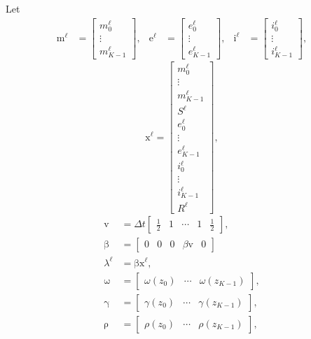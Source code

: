 \documentclass{jpmarticle}
\renewcommand{\vec}[1]{\boldsymbol{\mathrm{#1}}}
\begin{document}
Let
\begin{align}
  \vec{m}^{\ell} &=
  \begin{bmatrix}
    m_0^{\ell} \\ \vdots \\ m_{K - 1}^{\ell}
  \end{bmatrix},
  &
  \vec{e}^{\ell} &=
  \begin{bmatrix}
    e_0^{\ell} \\ \vdots \\ e_{K - 1}^{\ell}
  \end{bmatrix},
  &
  \vec{i}^{\ell} &=
  \begin{bmatrix}
    i_0^{\ell} \\ \vdots \\ i_{K - 1}^{\ell}
  \end{bmatrix},
\end{align}
\begin{equation}
  \vec{x}^{\ell} =
  \begin{bmatrix}
    m_0^{\ell} \\ \vdots \\ m_{K - 1}^{\ell} \\
    S^{\ell} \\
    e_0^{\ell} \\ \vdots \\ e_{K - 1}^{\ell} \\
    i_0^{\ell} \\ \vdots \\ i_{K - 1}^{\ell} \\
    R^{\ell}
  \end{bmatrix},
\end{equation}
\begin{equation}
  \begin{split}
    \vec{v} &=
    \Delta t
    \begin{bmatrix}
      \frac{1}{2} & 1 & \cdots & 1 & \frac{1}{2}
    \end{bmatrix},
    \\
    \vec{\beta} &=
    \begin{bmatrix}
      \vec{0} & 0 & \vec{0} & \beta \vec{v} & 0
    \end{bmatrix}
    \\
    \lambda^{\ell} &=
    \vec{\beta} \vec{x}^{\ell},
    \\
    \vec{\omega} &=
    \begin{bmatrix}
      \omega(z_0) & \cdots & \omega(z_{K - 1})
    \end{bmatrix},
    \\
    \vec{\gamma} &=
    \begin{bmatrix}
      \gamma(z_0) & \cdots & \gamma(z_{K - 1})
    \end{bmatrix},
    \\
    \vec{\rho} &=
    \begin{bmatrix}
      \rho(z_0) & \cdots & \rho(z_{K - 1})
    \end{bmatrix},
  \end{split}
\end{equation}
\end{document}
